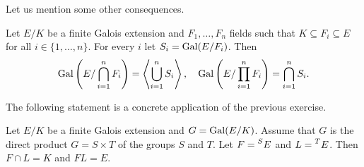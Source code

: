 Let us mention some other consequences.

\begin{exercise}
\label{xca:composite}
    Let $E/K$ be a finite Galois extension 
    and $F_1,\dots,F_n$ fields 
    such that $K\subseteq F_i\subseteq E$ for 
    all $i\in\{1,\dots,n\}$. For every 
    $i$ let $S_i=\operatorname{Gal}(E/F_i)$. Then
    \[
    \operatorname{Gal}\left(E/\bigcap_{i=1}^nF_i\right)=\left\langle\bigcup_{i=1}^nS_i\right\rangle,
    \quad
    \operatorname{Gal}\left(E/\prod_{i=1}^nF_i\right)=\bigcap_{i=1}^nS_i.
    \]
\end{exercise}

    
    

The following statement is a concrete application of the 
previous exercise.

\begin{exercise}
    Let $E/K$ be a finite Galois extension and $G=\operatorname{Gal}(E/K)$.
    Assume that $G$ is the direct product
    $G=S\times T$
    of the groups $S$ and $T$. Let 
    $F=\prescript{S}{}{E}$ and
    $L=\prescript{T}{}{E}$. Then $F\cap L=K$ and $FL=E$.
\end{exercise}

